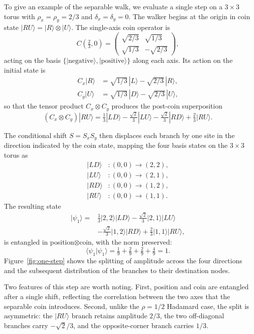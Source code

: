 To give an example of the separable walk, we evaluate a single step
on a $3 \times 3$ torus with $\rho_x = \rho_y = 2/3$ and
$\delta_x = \delta_y = 0$. The walker begins at the origin in coin
state $|RU\rangle = |R\rangle \otimes |U\rangle$. The single-axis coin
operator is
\begin{equation}
C\!\left(\tfrac{2}{3}, 0\right)
= \begin{pmatrix}
\sqrt{2/3} & \sqrt{1/3} \\
\sqrt{1/3} & -\sqrt{2/3}
\end{pmatrix},
\label{eq:coin-2-3}
\end{equation}
acting on the basis $\{|\text{negative}\rangle, |\text{positive}\rangle\}$
along each axis. Its action on the initial state is
\begin{align}
C_x |R\rangle &= \sqrt{1/3}\,|L\rangle - \sqrt{2/3}\,|R\rangle, \\
C_y |U\rangle &= \sqrt{1/3}\,|D\rangle - \sqrt{2/3}\,|U\rangle,
\end{align}
so that the tensor product $C_x \otimes C_y$ produces the post-coin
superposition
\begin{equation}
(C_x \otimes C_y)|RU\rangle
= \tfrac{1}{3}|LD\rangle - \tfrac{\sqrt{2}}{3}|LU\rangle
- \tfrac{\sqrt{2}}{3}|RD\rangle + \tfrac{2}{3}|RU\rangle.
\label{eq:post-coin}
\end{equation}

The conditional shift $S = S_x S_y$ then displaces each branch by one
site in the direction indicated by the coin state, mapping the four
basis states on the $3 \times 3$ torus as
\begin{align}
|LD\rangle &: (0,0) \to (2, 2), \\
|LU\rangle &: (0,0) \to (2, 1), \\
|RD\rangle &: (0,0) \to (1, 2), \\
|RU\rangle &: (0,0) \to (1, 1).
\end{align}
The resulting state
\begin{equation}
\begin{aligned}
|\psi_1\rangle
={}& \tfrac{1}{3}|2,2\rangle|LD\rangle
- \tfrac{\sqrt{2}}{3}|2,1\rangle|LU\rangle \\
&- \tfrac{\sqrt{2}}{3}|1,2\rangle|RD\rangle
+ \tfrac{2}{3}|1,1\rangle|RU\rangle,
\end{aligned}
\label{eq:state-after-one-step}
\end{equation}
is entangled in position$\otimes$coin, with the norm preserved:
\begin{equation}
\langle\psi_1|\psi_1\rangle
= \tfrac{1}{9} + \tfrac{2}{9} + \tfrac{2}{9} + \tfrac{4}{9} = 1.
\end{equation}
Figure~\ref{fig:one-step} shows the splitting of amplitude across the
four directions and the subsequent distribution of the branches to
their destination nodes.

Two features of this step are worth noting. First, position and coin
are entangled after a single shift, reflecting the correlation between
the two axes that the separable coin introduces. Second, unlike the
$\rho = 1/2$ Hadamard case, the split is asymmetric: the $|RU\rangle$
branch retains amplitude $2/3$, the two off-diagonal branches carry
$-\sqrt{2}/3$, and the opposite-corner branch carries $1/3$.
